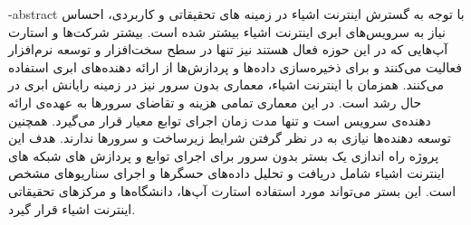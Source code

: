
\fa-abstract{
\fontsize{12pt}{18pt}\selectfont
با توجه به گسترش اینترنت اشیاء در زمینه های تحقیقاتی و کاربردی، احساس نیاز به سرویس‌های ابری اینترنت اشیاء بیشتر شده است.  بیشتر شرکت‌ها و استارت آپ‌هایی که در این حوزه فعال هستند نیز تنها در سطح سخت‌افزار و توسعه نرم‌افزار فعالیت می‌کنند و برای ذخیره‌سازی داده‌ها و پردازش‌ها از ارائه دهنده‌های ابری استفاده می‌کنند.
همزمان با اینترنت اشیاء، معماری بدون سرور نیز در زمینه رایانش ابری در حال رشد است. در این معماری تمامی هزینه و تقاضای سرورها به عهده‌ی ارائه دهنده‌ی سرویس است و تنها مدت زمان اجرای توابع معیار قرار می‌گیرد. همچنین توسعه دهنده‌ها نیازی به در نظر گرفتن شرايط زيرساخت و سرورها ندارند. هدف این پروژه راه اندازی یک بستر بدون سرور برای اجرای توابع و پردازش های شبکه های اینترنت اشیاء شامل دریافت و تحلیل داده‌های حسگرها و اجرای سناریوهای مشخص است. این بستر می‌تواند مورد استفاده استارت آپ‌ها، دانشگاه‌ها و مرکزهای تحقیقاتی اینترنت اشیاء قرار‌ گیرد.
}





\AUTtitle
